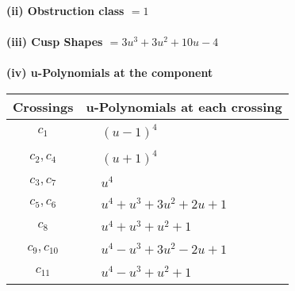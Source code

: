 \documentclass[1p]{elsarticle_modified}
\theoremstyle{definition}
\begin{document}
\flushleft \textbf{(ii) Obstruction class $= 1$}\\~\\
\flushleft \textbf{(iii) Cusp Shapes $= 3 u^3+3 u^2+10 u-4$}\\~\\
\newpage\renewcommand{\arraystretch}{1}
\flushleft \textbf{(iv) u-Polynomials at the component}\newline \\
\begin{tabular}{m{50pt}|m{274pt}}
Crossings & \hspace{64pt}u-Polynomials at each crossing \\
\hline $$\begin{aligned}c_{1}\end{aligned}$$&$\begin{aligned}
&(u-1)^4
\end{aligned}$\\
\hline $$\begin{aligned}c_{2},c_{4}\end{aligned}$$&$\begin{aligned}
&(u+1)^4
\end{aligned}$\\
\hline $$\begin{aligned}c_{3},c_{7}\end{aligned}$$&$\begin{aligned}
&u^4
\end{aligned}$\\
\hline $$\begin{aligned}c_{5},c_{6}\end{aligned}$$&$\begin{aligned}
&u^4+u^3+3 u^2+2 u+1
\end{aligned}$\\
\hline $$\begin{aligned}c_{8}\end{aligned}$$&$\begin{aligned}
&u^4+u^3+u^2+1
\end{aligned}$\\
\hline $$\begin{aligned}c_{9},c_{10}\end{aligned}$$&$\begin{aligned}
&u^4- u^3+3 u^2-2 u+1
\end{aligned}$\\
\hline $$\begin{aligned}c_{11}\end{aligned}$$&$\begin{aligned}
&u^4- u^3+u^2+1
\end{aligned}$\\
\hline
\end{tabular}\\~\\
\end{document}

